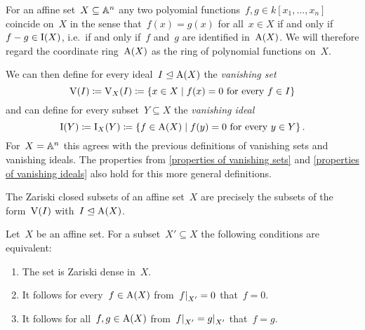 \begin{fluff}
  For an affine set~$X \subseteq \mathbb{A}^n$ any two polyomial functions~$f, g \in k[x_1, \dotsc, x_n]$ coincide on~$X$ in the sense that~$f(x) = g(x)$ for all~$x \in X$ if and only if~$f - g \in \operatorname{I}(X)$, i.e.\ if and only if~$f$ and~$g$ are identified in~$\operatorname{A}(X)$.
  We will therefore regard the coordinate ring~$\operatorname{A}(X)$ as the ring of polynomial functions on~$X$.
  
  We can then define for every ideal~$I \trianglelefteq \operatorname{A}(X)$ the \emph{vanishing set}
  \[
              \vset(I)
    \defined  \vset_X(I)
    \defined  \{
                x \in X
              \suchthat
                \text{$f(x) = 0$ for every~$f \in I$}
              \}
  \]
  and can define for every subset~$Y \subseteq X$ the \emph{vanishing ideal}
  \[
              \videal(Y)
    \defined  \videal_X(Y)
    \defined  \{
                f \in \coord(X)
              \suchthat
                \text{$f(y) = 0$ for every~$y \in Y$}
              \} \,.
  \]
  For~$X = \mathbb{A}^n$ this agrees with the previous definitions of vanishing sets and vanishing ideals.
  The properties from \cref{properties of vanishing sets} and \cref{properties of vanishing ideals} also hold for this more general definitions.
\end{fluff}


\begin{lemma}
  The Zariski closed subsets of an affine set~$X$ are precisely the subsets of the form~$\operatorname{V}(I)$ with~$I \trianglelefteq \operatorname{A}(X)$.
  \qedhere
\end{lemma}


\begin{corollary}
  \label{characterization of zariski dense}
  Let~$X$ be an affine set.
  For a subset~$X' \subseteq X$ the following conditions are equivalent:
  \begin{enumerate}
    \item
      The set is Zariski dense in~$X$.
    \item
      It follows for every~$f \in \operatorname{A}(X)$ from~$\restrict{f}{X'} = 0$ that~$f = 0$.
    \item
      It follows for all~$f, g \in \operatorname{A}(X)$ from~$\restrict{f}{X'} = \restrict{g}{X'}$ that~$f = g$.
  \end{enumerate}
\end{corollary}


